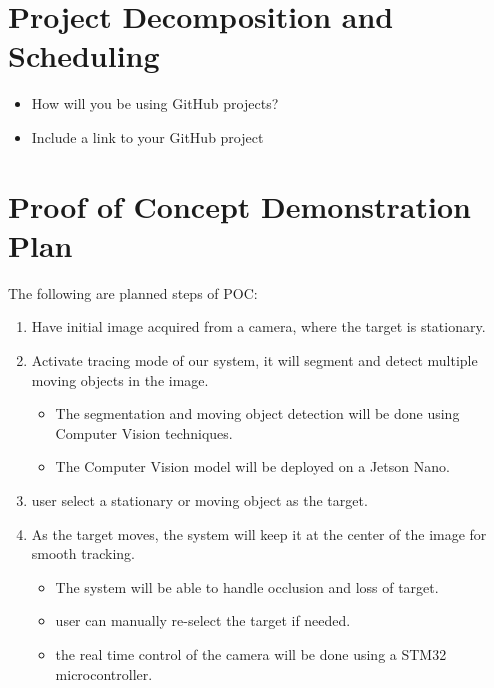 \documentclass{article}
\begin{document}
\section{Project Decomposition and Scheduling}

\begin{itemize}
  \item How will you be using GitHub projects?
  \item Include a link to your GitHub project
\end{itemize}


\section{Proof of Concept Demonstration Plan}

The following are planned steps of POC:

\begin{enumerate}
  \item Have initial image acquired from a camera, where the target is stationary.
  \item Activate tracing mode of our system, it will segment and detect multiple moving
        objects in the image.
        \begin{itemize}
          \item The segmentation and moving object detection will be done using Computer Vision
                techniques.
          \item The Computer Vision model will be deployed on a Jetson Nano.
        \end{itemize}
  \item user select a stationary or moving object as the target.
  \item As the target moves, the system will keep it at the center of the image for
        smooth tracking.
        \begin{itemize}
          \item The system will be able to handle occlusion and loss of target.
          \item user can manually re-select the target if needed.
          \item the real time control of the camera will be done using a STM32 microcontroller.
        \end{itemize}
\end{enumerate}
\end{document}
